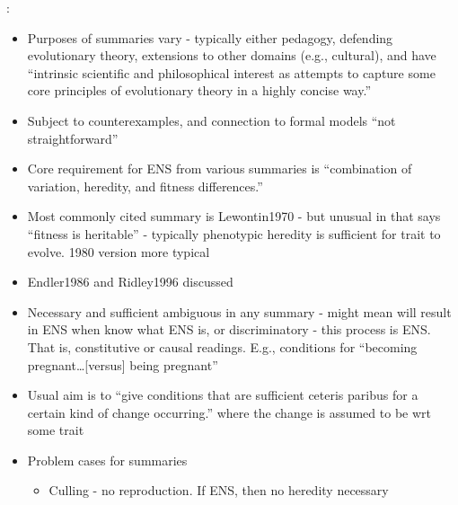 \autocite{Godley-Smith2007}:

\begin{itemize}
	\item
	
	Purposes of summaries vary - typically either pedagogy, defending
	evolutionary theory, extensions to other domains (e.g., cultural), and
	have ``intrinsic scientific and philosophical interest as attempts to
	capture some core principles of evolutionary theory in a highly
	concise way.''
	
	\item
	
	Subject to counterexamples, and connection to formal models ``not
	straightforward''
	
	\item
	
	Core requirement for ENS from various summaries is ``combination of
	variation, heredity, and fitness differences.''
	
	\item
	
	Most commonly cited summary is Lewontin1970 - but unusual in that says
	``fitness is heritable'' - typically phenotypic heredity is sufficient
	for trait to evolve. 1980 version more typical
	
	\item
	
	Endler1986 and Ridley1996 discussed
	
	\item
	
	Necessary and sufficient ambiguous in any summary - might mean will
	result in ENS when know what ENS is, or discriminatory - this process
	is ENS. That is, constitutive or causal readings. E.g., conditions for
	``becoming pregnant\ldots{}{[}versus{]} being pregnant''
	
	\item
	
	Usual aim is to ``give conditions that are sufficient ceteris paribus
	for a certain kind of change occurring.'' where the change is assumed
	to be wrt some trait
	
	\item
	
	Problem cases for summaries
	
	
	\begin{itemize}
		\item
		
		Culling - no reproduction. If ENS, then no heredity necessary
		

\end{itemize}
\end{itemize}
